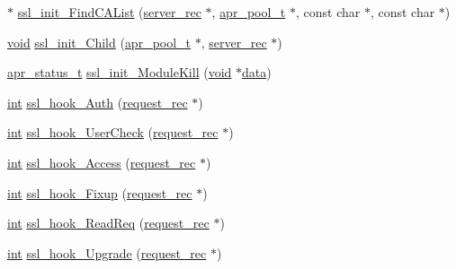 \begin{DoxyCompactItemize}
\item 
$\ast$ \hyperlink{group__MOD__SSL__PRIVATE_ga373b786344963b09793f4df50db25783}{ssl\+\_\+init\+\_\+\+Find\+C\+A\+List} (\hyperlink{structserver__rec}{server\+\_\+rec} $\ast$, \hyperlink{structapr__pool__t}{apr\+\_\+pool\+\_\+t} $\ast$, const char $\ast$, const char $\ast$)
\item 
\hyperlink{group__MOD__ISAPI_gacd6cdbf73df3d9eed42fa493d9b621a6}{void} \hyperlink{group__MOD__SSL__PRIVATE_gae2c49d9210f335cb8066ef6c07313483}{ssl\+\_\+init\+\_\+\+Child} (\hyperlink{structapr__pool__t}{apr\+\_\+pool\+\_\+t} $\ast$, \hyperlink{structserver__rec}{server\+\_\+rec} $\ast$)
\item 
\hyperlink{group__apr__errno_gaa5105fa83cc322f09382292db8b47593}{apr\+\_\+status\+\_\+t} \hyperlink{group__MOD__SSL__PRIVATE_ga5add0a1e14930a96409c4cb0995b8c3c}{ssl\+\_\+init\+\_\+\+Module\+Kill} (\hyperlink{group__MOD__ISAPI_gacd6cdbf73df3d9eed42fa493d9b621a6}{void} $\ast$\hyperlink{structdata}{data})
\item 
\hyperlink{pcre_8txt_a42dfa4ff673c82d8efe7144098fbc198}{int} \hyperlink{group__MOD__SSL__PRIVATE_ga2fe6a1d0e02d1e45b710560b1fabdaf5}{ssl\+\_\+hook\+\_\+\+Auth} (\hyperlink{structrequest__rec}{request\+\_\+rec} $\ast$)
\item 
\hyperlink{pcre_8txt_a42dfa4ff673c82d8efe7144098fbc198}{int} \hyperlink{group__MOD__SSL__PRIVATE_gad3d9944f83c140770fb32701e7083838}{ssl\+\_\+hook\+\_\+\+User\+Check} (\hyperlink{structrequest__rec}{request\+\_\+rec} $\ast$)
\item 
\hyperlink{pcre_8txt_a42dfa4ff673c82d8efe7144098fbc198}{int} \hyperlink{group__MOD__SSL__PRIVATE_gad536620d986d5e4c72891abcdf205036}{ssl\+\_\+hook\+\_\+\+Access} (\hyperlink{structrequest__rec}{request\+\_\+rec} $\ast$)
\item 
\hyperlink{pcre_8txt_a42dfa4ff673c82d8efe7144098fbc198}{int} \hyperlink{group__MOD__SSL__PRIVATE_ga2574b28e07747ea87febd970f9a76eb3}{ssl\+\_\+hook\+\_\+\+Fixup} (\hyperlink{structrequest__rec}{request\+\_\+rec} $\ast$)
\item 
\hyperlink{pcre_8txt_a42dfa4ff673c82d8efe7144098fbc198}{int} \hyperlink{group__MOD__SSL__PRIVATE_gab9e4b8c8cb8d3cbbdc226c4de311de51}{ssl\+\_\+hook\+\_\+\+Read\+Req} (\hyperlink{structrequest__rec}{request\+\_\+rec} $\ast$)
\item 
\hyperlink{pcre_8txt_a42dfa4ff673c82d8efe7144098fbc198}{int} \hyperlink{group__MOD__SSL__PRIVATE_ga96800847d8c584271d88f1deb5ff2886}{ssl\+\_\+hook\+\_\+\+Upgrade} (\hyperlink{structrequest__rec}{request\+\_\+rec} $\ast$)

\end{DoxyCompactItemize}
